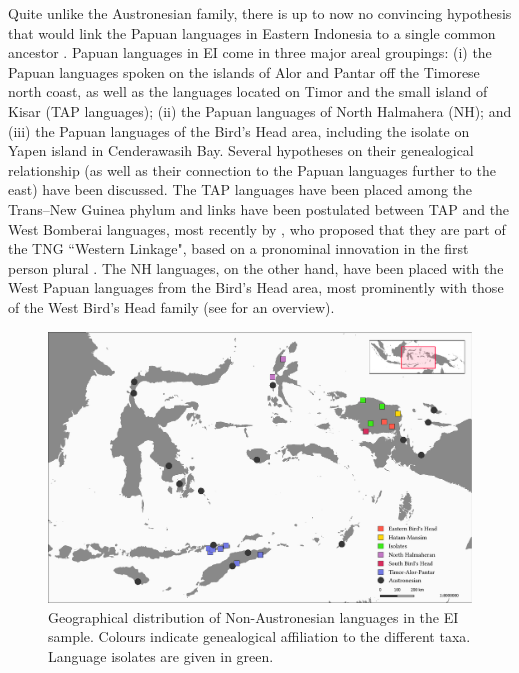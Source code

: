 Quite unlike the Austronesian family, there is up to now no convincing hypothesis that would link the Papuan languages in Eastern Indonesia to a single common ancestor \citep{reesink2005west, klamer2008east}. Papuan languages in EI come in three major areal groupings: (i) the Papuan languages spoken on the islands of Alor and Pantar off the Timorese north coast, as well as the languages located on Timor and the small island of Kisar (\textsc{TAP} languages); (ii) the Papuan languages of North Halmahera (NH); and (iii) the Papuan languages of the Bird's Head area, including the isolate  on Yapen island in Cenderawasih Bay. Several hypotheses on their genealogical relationship (as well as their connection to the Papuan languages further to the east) have been discussed. The TAP languages have been placed among the Trans--New Guinea phylum and links have been postulated between TAP and the West Bomberai languages, most recently by \citet{Ross2005}, who proposed that they are part of the TNG ``Western Linkage", based on a pronominal innovation in the first person plural \citep[9]{schapper2014intro}. The NH languages, on the other hand, have been placed with the West Papuan languages from the Bird's Head area, most prominently with those of the West Bird's Head family (see \citealt{reesink2005west} for an overview).

\begin{figure}
\includegraphics[width=\columnwidth]{figures/languages_aff_pap.pdf}
\caption[Geographical distribution of Non-Austronesian languages in the sample]{Geographical distribution of Non-Austronesian languages in the EI sample. Colours indicate genealogical affiliation to the different taxa. Language isolates are given in green.}\label{map:Austro2}
\end{figure}

